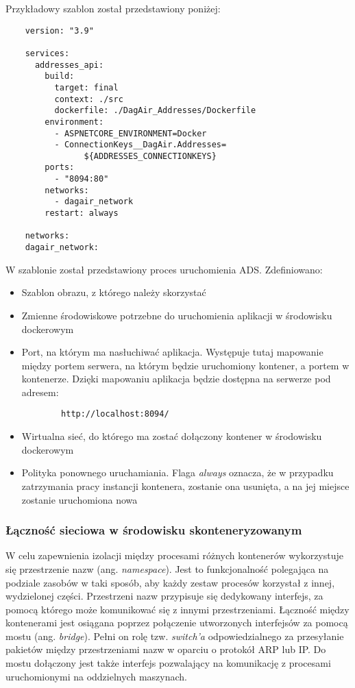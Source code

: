 Przykładowy szablon został przedstawiony poniżej:

\begin{lstlisting}
    version: "3.9"

    services:
      addresses_api:
        build:
          target: final
          context: ./src
          dockerfile: ./DagAir_Addresses/Dockerfile
        environment:
          - ASPNETCORE_ENVIRONMENT=Docker
          - ConnectionKeys__DagAir.Addresses=
                ${ADDRESSES_CONNECTIONKEYS}
        ports:
          - "8094:80"
        networks:
          - dagair_network
        restart: always

    networks:
    dagair_network:
\end{lstlisting}

W szablonie został przedstawiony proces uruchomienia ADS. Zdefiniowano:

\begin{itemize}
    \item Szablon obrazu, z którego należy skorzystać
    \item Zmienne środowiskowe potrzebne do uruchomienia aplikacji w środowisku dockerowym
    \item Port, na którym ma nasłuchiwać aplikacja. Występuje tutaj mapowanie między portem 
    serwera, na którym będzie uruchomiony kontener, a portem w kontenerze. Dzięki mapowaniu
    aplikacja będzie dostępna na serwerze pod adresem:

    \begin{lstlisting}
        http://localhost:8094/
    \end{lstlisting}
    \item Wirtualna sieć, do którego ma zostać dołączony kontener w środowisku dockerowym
    \item Polityka ponownego uruchamiania. Flaga \textit{always} oznacza, że w przypadku zatrzymania pracy
    instancji kontenera, zostanie ona usunięta, a na jej miejsce zostanie uruchomiona nowa
\end{itemize}

\subsubsection{Łączność sieciowa w środowisku skonteneryzowanym}
\label{subsubection:lacznosc-sieciowa-docker}
W celu zapewnienia izolacji między procesami różnych kontenerów wykorzystuje się
przestrzenie nazw (ang. \textit{namespace}). Jest to funkcjonalność polegająca na podziale zasobów w taki sposób, aby
każdy zestaw procesów korzystał z innej, wydzielonej części. Przestrzeni nazw przypisuje się dedykowany
interfejs, za pomocą którego może komunikować się z innymi przestrzeniami. Łączność między kontenerami
jest osiągana poprzez połączenie utworzonych interfejsów za pomocą mostu (ang. \textit{bridge}).
Pełni on rolę tzw. \textit{switch'a} odpowiedzialnego za przesyłanie pakietów między przestrzeniami nazw
w oparciu o protokół ARP lub IP. Do mostu dołączony jest także interfejs pozwalający na komunikację
z procesami uruchomionymi na oddzielnych maszynach.

